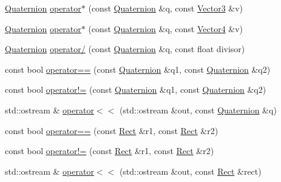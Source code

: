 \begin{DoxyCompactItemize}
\item 
\hyperlink{classprism_1_1geometry_1_1_quaternion}{Quaternion} \hyperlink{namespaceprism_1_1geometry_a70ee00be58df7ba1affaddd24b152ba0}{operator$\ast$} (const \hyperlink{classprism_1_1geometry_1_1_quaternion}{Quaternion} \&q, const \hyperlink{classprism_1_1geometry_1_1_vector3}{Vector3} \&v)
\item 
\hyperlink{classprism_1_1geometry_1_1_quaternion}{Quaternion} \hyperlink{namespaceprism_1_1geometry_a43a01bf4cbc175aac2e375f493c4c386}{operator$\ast$} (const \hyperlink{classprism_1_1geometry_1_1_quaternion}{Quaternion} \&q, const \hyperlink{classprism_1_1geometry_1_1_vector4}{Vector4} \&v)
\item 
\hyperlink{classprism_1_1geometry_1_1_quaternion}{Quaternion} \hyperlink{namespaceprism_1_1geometry_adcf94fa1d43e1e955eeaafd6216fe97a}{operator/} (const \hyperlink{classprism_1_1geometry_1_1_quaternion}{Quaternion} \&q, const float divisor)
\item 
const bool \hyperlink{namespaceprism_1_1geometry_a8721427f146110a653c991ac8d286849}{operator==} (const \hyperlink{classprism_1_1geometry_1_1_quaternion}{Quaternion} \&q1, const \hyperlink{classprism_1_1geometry_1_1_quaternion}{Quaternion} \&q2)
\item 
const bool \hyperlink{namespaceprism_1_1geometry_a1e5590575e7198fb69d0e95b4c3d3ef5}{operator!=} (const \hyperlink{classprism_1_1geometry_1_1_quaternion}{Quaternion} \&q1, const \hyperlink{classprism_1_1geometry_1_1_quaternion}{Quaternion} \&q2)
\item 
std\+::ostream \& \hyperlink{namespaceprism_1_1geometry_a5fbbd24939244132cb8a758f2e867b9b}{operator$<$$<$} (std\+::ostream \&out, const \hyperlink{classprism_1_1geometry_1_1_quaternion}{Quaternion} \&q)
\item 
const bool \hyperlink{namespaceprism_1_1geometry_a8671e7db673dd0282ec03ef56780fd96}{operator==} (const \hyperlink{classprism_1_1geometry_1_1_rect}{Rect} \&r1, const \hyperlink{classprism_1_1geometry_1_1_rect}{Rect} \&r2)
\item 
const bool \hyperlink{namespaceprism_1_1geometry_aab57687dd4b538325b7eb1caf5f0dc95}{operator!=} (const \hyperlink{classprism_1_1geometry_1_1_rect}{Rect} \&r1, const \hyperlink{classprism_1_1geometry_1_1_rect}{Rect} \&r2)
\item 
std\+::ostream \& \hyperlink{namespaceprism_1_1geometry_a6ad3cf60bcf7d264fdbf0ab16e1b9603}{operator$<$$<$} (std\+::ostream \&out, const \hyperlink{classprism_1_1geometry_1_1_rect}{Rect} \&rect)
\item 

\end{DoxyCompactItemize}
